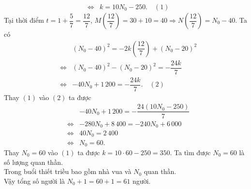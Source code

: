 \begin{ex}
{\begin{itemchoice}
\begin{eqnarray*}
				&\Leftrightarrow& k = 10N_0 - 250. \quad (1)
			\end{eqnarray*}
			Tại thời điểm $t = 1 + \dfrac{5}{7} = \dfrac{12}{7}$, $M\left(\dfrac{12}{7}\right) = 30 + 10 = 40 \Rightarrow N\left(\dfrac{12}{7}\right) = N_0 - 40$. Ta có
			\allowdisplaybreaks
			\begin{eqnarray*}
				& &(N_0 - 40)^2 = -2k\left(\dfrac{12}{7}\right) + (N_0 - 20)^2 \\
				&\Leftrightarrow& (N_0 - 40)^2 - (N_0 - 20)^2 = -\dfrac{24k}{7} \\
				&\Leftrightarrow& -40N_0 + 1\,200 = -\dfrac{24k}{7}. \quad (2)
			\end{eqnarray*}
			Thay $(1)$ vào $(2)$ ta được
			\allowdisplaybreaks
			\begin{eqnarray*}
				&&-40N_0 + 1\,200 = -\dfrac{24(10N_0 - 250)}{7} \\
				&\Leftrightarrow& -280N_0 + 8\,400 = -240N_0 + 6\,000 \\
				&\Leftrightarrow& 40N_0 = 2\,400 \\
				&\Leftrightarrow& N_0 = 60.
			\end{eqnarray*}
			Thay $N_0 = 60$ vào $(1)$ ta được $k = 10\cdot 60 - 250 = 350$.
			\itemch Ta tìm được $N_0 = 60$ là số lượng quan thần.\\
			Trong buổi thiết triều bao gồm nhà vua và $N_0$ quan thần.\\
			Vậy tổng số người là $N_0 + 1 = 60 + 1 = 61$ người.
		\end{itemchoice}
	}
\end{ex}


